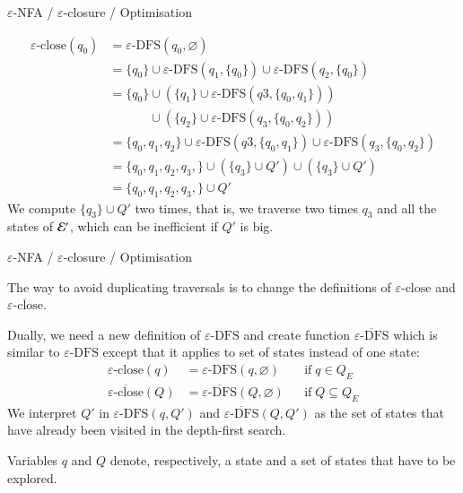 \documentclass[compress,dvips,xcolor={dvipsnames},t]{beamer}
\newcommand\eNFA{\(\varepsilon\)-NFA\xspace}
\newcommand\eClose{\varepsilon\text{-close}}
\newcommand\eDFS{\varepsilon\text{-DFS}}
\newcommand\eDFSset{\overline{\varepsilon\text{-DFS}}}
\newcommand\eCloseSet{\overline{\eClose}}
\begin{document}
%
\begin{frame}{\eNFA{} / \(\varepsilon\)-closure / Optimisation}

\begin{align*}
   \eClose (q_0)
&= \eDFS (q_0, \varnothing)\\
&= \{q_0\} \cup \eDFS (q_1, \{q_0\}) \cup \eDFS (q_2, \{q_0\})\\
&= \{q_0\} \cup (\{q_1\} \cup \eDFS (q3, \{q_0, q_1\}))\\
&\mathrel{\phantom{=}} \phantom{\{q_0\}}{} \cup (\{q_2\} \cup \eDFS
   (q_3, \{q_0, q_2\}))\\
&= \{q_0, q_1, q_2\} \cup \eDFS (q3, \{q_0, q_1\}) \cup \eDFS
   (q_3, \{q_0, q_2\})\\
&= \{q_0, q_1, q_2, q_3,\} \cup (\{q_3\} \cup Q') \cup (\{q_3\} \cup Q')\\
&= \{q_0, q_1, q_2, q_3,\} \cup Q'
\end{align*}
We compute \(\{q_3\} \cup Q'\) two times, that is, we traverse two
times \(q_3\) and all the states of \(\cal E'\), which can be
inefficient if \(Q'\) is big.

\end{frame}

%
\begin{frame}{\eNFA{} / \(\varepsilon\)-closure / Optimisation}

The way to avoid duplicating traversals is to change the definitions
of \(\eClose\) and \(\eCloseSet\).

Dually, we need a new definition of \(\eDFS\) and create function
\(\eDFSset\) which is similar to \(\eDFS\) except that it applies to
set of states instead of one state:
\begin{align*}
   \eClose (q)
&= \eDFS (q, \varnothing)
&& \text{if} \; q \in Q_E\\
   \eCloseSet (Q)
&= \eDFSset (Q, \varnothing)
&& \text{if} \; Q \subseteq Q_E
\end{align*}
We interpret \(Q'\) in \(\eDFS (q, Q')\) and \(\eDFSset (Q, Q')\) as
the set of states that have already been visited in the depth-first
search.

\bigskip

Variables \(q\) and \(Q\) denote, respectively, a state and a set of
states that have to be explored.

\end{frame}
\end{document}
